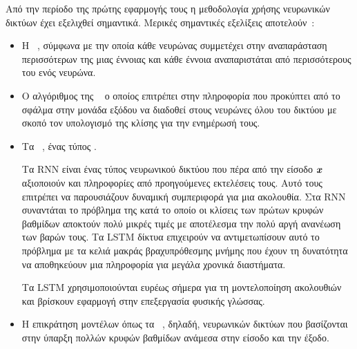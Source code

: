 Από την περίοδο της πρώτης εφαρμογής τους η μεθοδολογία χρήσης νευρωνικών δικτύων έχει εξελιχθεί σημαντικά.
Μερικές σημαντικές εξελίξεις αποτελούν~\cite{goodfellow}:
\begin{itemize}
    \item Η ~\cite{hinton1986learning},
          σύμφωνα με την οποία κάθε νευρώνας συμμετέχει στην αναπαράσταση περισσότερων της μιας έννοιας και κάθε έννοια αναπαριστάται από περισσότερους του ενός νευρώνα.
    \item Ο αλγόριθμος της ~\cite{werbos1974beyond,lecun1985procedure,parker1985learning,rumelhart1988learning}
          ο οποίος επιτρέπει στην πληροφορία που προκύπτει από το σφάλμα στην μονάδα εξόδου να διαδοθεί στους νευρώνες όλου του δικτύου με σκοπό τον υπολογισμό της κλίσης για την ενημέρωσή τους.
    \item Τα ~\cite{hochreiter1997long},
          ένας τύπος .

          Τα RNN είναι ένας τύπος νευρωνικού δικτύου που πέρα από την είσοδο $\vx$ αξιοποιούν και πληροφορίες από προηγούμενες εκτελέσεις τους.
          Αυτό τους επιτρέπει να παρουσιάζουν δυναμική συμπεριφορά για μια ακολουθία.
          Στα RNN συναντάται το πρόβλημα της  κατά το οποίο οι κλίσεις των πρώτων κρυφών βαθμίδων αποκτούν πολύ μικρές τιμές με αποτέλεσμα την πολύ αργή ανανέωση των βαρών τους.
          Τα LSTM δίκτυα επιχειρούν να αντιμετωπίσουν αυτό το πρόβλημα με τα κελιά μακράς βραχυπρόθεσμης μνήμης που έχουν τη δυνατότητα να αποθηκεύουν μια πληροφορία για μεγάλα χρονικά διαστήματα.

          Τα LSTM χρησιμοποιούνται ευρέως σήμερα για τη μοντελοποίηση ακολουθιών και βρίσκουν εφαρμογή στην επεξεργασία φυσικής γλώσσας.
    \item Η επικράτηση μοντέλων 
          όπως τα ~\cite{hinton2006fast},
          δηλαδή, νευρωνικών δικτύων που βασίζονται στην ύπαρξη πολλών κρυφών βαθμίδων ανάμεσα στην είσοδο και την έξοδο.
\end{itemize}


